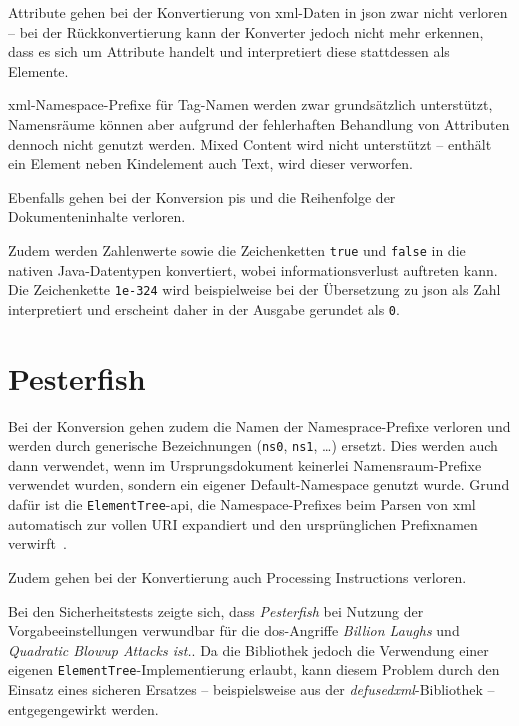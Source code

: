 Attribute gehen bei der Konvertierung von \acrshort{xml}-Daten in \acrshort{json} zwar nicht verloren -- bei der Rückkonvertierung kann der Konverter jedoch nicht mehr erkennen, dass es sich um Attribute handelt und interpretiert diese stattdessen als Elemente.

\acrshort{xml}-Namespace-Prefixe für Tag-Namen werden zwar grundsätzlich unterstützt, Namensräume können aber aufgrund der fehlerhaften Behandlung von Attributen dennoch nicht genutzt werden.
 Mixed Content wird nicht unterstützt -- enthält ein Element neben Kindelement auch Text, wird dieser verworfen.

Ebenfalls gehen bei der Konversion \glspl{pi} und die Reihenfolge der Dokumenteninhalte verloren.

Zudem werden Zahlenwerte sowie die Zeichenketten \texttt{true} und \texttt{false} in die nativen Java-Datentypen konvertiert, wobei informationsverlust auftreten kann. Die Zeichenkette \texttt{1e-324} wird beispielweise bei der Übersetzung zu \acrshort{json} als Zahl interpretiert und erscheint daher in der Ausgabe gerundet als \texttt{0}.

\section{Pesterfish}
\label{sec:pesterfish}

Bei der Konversion gehen zudem die Namen der Namesprace-Prefixe verloren und werden durch generische Bezeichnungen (\texttt{ns0}, \texttt{ns1}, \dots{}) ersetzt. Dies werden auch dann verwendet, wenn im Ursprungsdokument keinerlei Namensraum-Prefixe verwendet wurden, sondern ein eigener Default-Namespace genutzt wurde. Grund dafür ist die \texttt{ElementTree}-\acrshort{api}, die Namespace-Prefixes beim Parsen von \acrshort{xml} automatisch zur vollen URI expandiert und den ursprünglichen Prefixnamen verwirft~\cite[Abschn.~20.5.1.7]{pythonetreexmlns}.

Zudem gehen bei der Konvertierung auch Processing Instructions verloren.

Bei den Sicherheitstests zeigte sich, dass \emph{Pesterfish} bei Nutzung der Vorgabeeinstellungen verwundbar für die \acrshort{dos}-Angriffe \emph{Billion Laughs} und \emph{Quadratic Blowup Attacks ist.}. Da die Bibliothek jedoch die Verwendung einer eigenen \texttt{ElementTree}-Implementierung erlaubt, kann diesem Problem durch den Einsatz eines sicheren Ersatzes -- beispielsweise aus der \emph{defusedxml}-Bibliothek -- entgegengewirkt werden.

